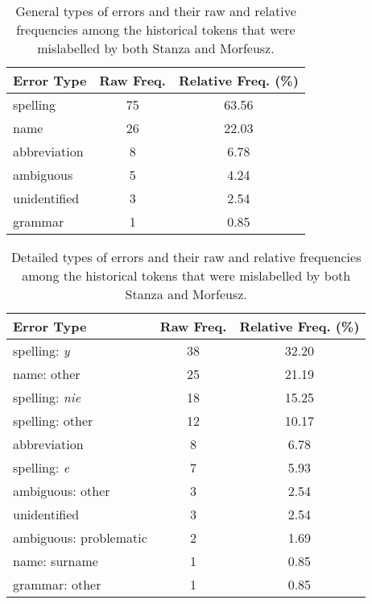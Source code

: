 \renewcommand{\arraystretch}{1.25}
\begin{table}[h]
\begin{center}
\begin{tabular}{|l|cc|}
\hline \bf Error Type & \bf Raw Freq. & \bf Relative Freq. (\%) \\ \hline
spelling & 75 & 63.56  \\
name & 26 & 22.03  \\
abbreviation & 8 & 6.78 \\
ambiguous & 5 & 4.24 \\
unidentified & 3 & 2.54 \\
grammar & 1 & 0.85 \\
\hline
\end{tabular}
\caption{\label{table:general-lowercase-lemmas-errors} General types of errors and their raw and relative frequencies among the historical tokens that were mislabelled by both Stanza and Morfeusz.}
\end{center}
\end{table}

\renewcommand{\arraystretch}{1.25}
\begin{table}[h]
\begin{center}
\begin{tabular}{|l|cc|}
\hline \bf Error Type & \bf Raw Freq. & \bf Relative Freq. (\%) \\ \hline
spelling: \textit{y} & 38 & 32.20  \\
name: other & 25 & 21.19  \\
spelling: \textit{nie} & 18 & 15.25 \\
spelling: other & 12 & 10.17 \\ 
abbreviation & 8 & 6.78 \\
spelling: \textit{e} & 7 & 5.93 \\
ambiguous: other & 3 & 2.54 \\
unidentified & 3 & 2.54 \\
ambiguous: problematic & 2 & 1.69 \\
name: surname & 1 & 0.85 \\
grammar: other & 1 & 0.85 \\
\hline
\end{tabular}
\caption{\label{table:lowercase-lemmas-errors} Detailed types of errors and their raw and relative frequencies among the historical tokens that were mislabelled by both Stanza and Morfeusz.}
\end{center}
\end{table}

